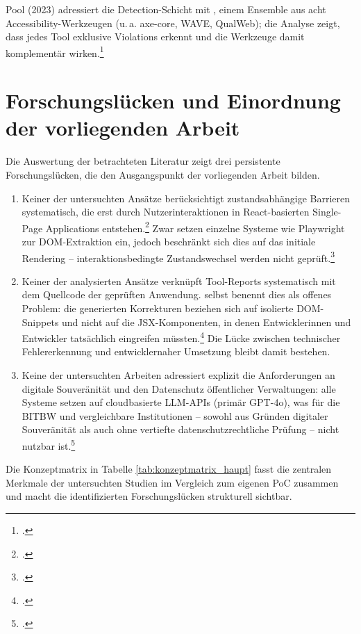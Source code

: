 Pool (2023) adressiert die Detection-Schicht mit , einem Ensemble aus acht Accessibility-Werkzeugen (u.\,a. axe-core, WAVE, QualWeb); die Analyse zeigt, dass jedes Tool exklusive Violations erkennt und die Werkzeuge damit komplementär wirken.\footcite[Vgl.][]{pool_testaro_2023}

\section{Forschungslücken und Einordnung der vorliegenden Arbeit} \label{Forschungslücken}

Die Auswertung der betrachteten Literatur zeigt drei persistente Forschungslücken, die den Ausgangspunkt der vorliegenden Arbeit bilden.

\begin{enumerate}
    \item Keiner der untersuchten Ansätze berücksichtigt zustandsabhängige Barrieren systematisch, die erst durch Nutzerinteraktionen in React-basierten Single-Page Applications entstehen.\footcite[Vgl.][S. 110]{tafreshipour_ma11y_2024} Zwar setzen einzelne Systeme wie  Playwright zur \ac{DOM}-Extraktion ein, jedoch beschränkt sich dies auf das initiale Rendering -- interaktionsbedingte Zustandswechsel werden nicht geprüft.\footcite[Vgl.][]{fathallah_accessguru_2025}
    \item Keiner der analysierten Ansätze verknüpft Tool-Reports systematisch mit dem Quell\-code der geprüften Anwendung.  selbst benennt dies als offenes Problem: die generierten Korrekturen beziehen sich auf isolierte \ac{DOM}-Snippets und nicht auf die \ac{JSX}-Komponenten, in denen Entwicklerinnen und Entwickler tatsächlich eingreifen müssten.\footcite[Vgl.][]{fathallah_accessguru_2025} Die Lücke zwischen technischer Fehlererkennung und entwicklernaher Umsetzung bleibt damit bestehen.
    \item Keine der untersuchten Arbeiten adressiert explizit die Anforderungen an digitale Souveränität und den Datenschutz öffentlicher Verwaltungen: alle Systeme setzen auf cloudbasierte \ac{LLM}-\ac{API}s (primär GPT-4o), was für die \ac{BITBW} und vergleichbare Institutionen -- sowohl aus Gründen digitaler Souveränität als auch ohne vertiefte datenschutzrechtliche Prüfung -- nicht nutzbar ist.\footcites[Vgl.][]{bmds_digitale_souveraenitaet}[][Art. 28, 44 ff.]{dsgvo2016}
\end{enumerate}

Die Konzeptmatrix in Tabelle \ref{tab:konzeptmatrix_haupt} fasst die zentralen Merkmale der untersuchten Studien im Vergleich zum eigenen \ac{PoC} zusammen und macht die identifizierten Forschungslücken strukturell sichtbar.

